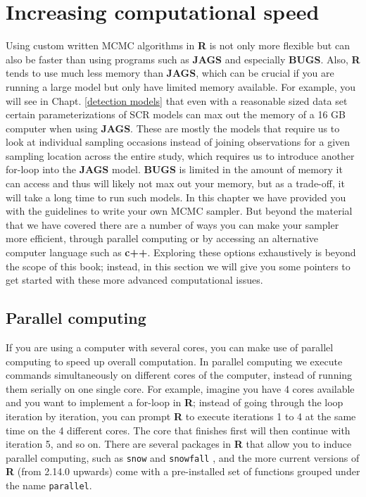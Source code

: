 \section{Increasing computational speed}
Using custom written MCMC algorithms in {\bf R} is not only more flexible but can also be faster than using programs such as {\bf JAGS} and especially {\bf BUGS}. Also, {\bf R} tends to use much less memory than {\bf JAGS}, which can be crucial if you are running a large model but only have limited memory available. For example, you will see in Chapt. \ref{detection models} that even with a reasonable sized data set certain parameterizations of SCR models can max out the memory of a 16 GB computer when using {\bf JAGS}. These are mostly the models that require us to look at individual sampling occasions instead of joining observations for a given sampling location across the entire study, which requires us to introduce another for-loop into the {\bf JAGS} model. {\bf BUGS} is limited in the amount of memory it can access and thus will likely not max out your memory, but as a trade-off, it will take a long time to run such models. In this chapter we have provided you with the guidelines to write your own MCMC sampler. But beyond the material that we have covered there are a number of ways you can make your sampler more efficient, through parallel computing or by accessing an alternative computer language such as {\bf c++}. Exploring these options exhaustively is beyond the scope of this book; instead, in this section we will give you some pointers to get started with these more advanced computational issues.

\subsection{Parallel computing}
If you are using a computer with several cores, you can make use of parallel computing to speed up overall computation. In parallel computing we execute commands simultaneously on different cores of the computer, instead of running them serially on one single core. For example, imagine you have 4 cores available and you want to implement a for-loop in {\bf R}; instead of going through the loop iteration by iteration, you can prompt {\bf R} to execute iterations 1 to 4 at the same time on the 4 different cores. The core that finishes first will then continue with iteration 5, and so on.  There are several packages in {\bf R} that allow you to induce parallel computing, such as {\tt snow} \citep{tierney_etal:2011} and {\tt snowfall} \citep{knaus:2010}, and the more current versions of {\bf R} (from 2.14.0 upwards) come with a pre-installed set of functions grouped under the name {\tt parallel}.

